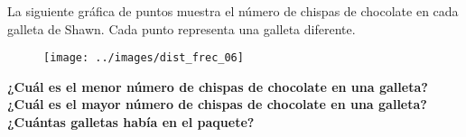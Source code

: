 La siguiente gráfica de puntos muestra el número de chispas de chocolate en cada galleta de Shawn. Cada punto representa una galleta diferente.
\begin{figure}[H]
    \begin{center}
        \texttt{[image: ../images/dist\_frec\_06]}
    \end{center}
    \caption{}
    \label{fig:dist_frec_06}
\end{figure}
\textbf{¿Cuál es el menor número de chispas de chocolate en una galleta?}\\
\textbf{¿Cuál es el mayor número de chispas de chocolate en una galleta?}\\
\textbf{¿Cuántas galletas había en el paquete?}